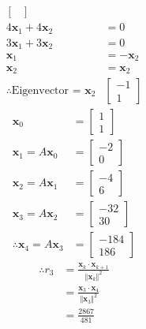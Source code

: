 \documentclass[12pt, a4paper]{scrartcl}
\begin{document}
\begin{enumerate}
\begin{enumerate}
\begin{align*}
\begin{bmatrix}
                    \end{bmatrix}
                    \\ 4\textbf{x}_1+4\textbf{x}_2&=0
                    \\ 3\textbf{x}_1+3\textbf{x}_2&=0
                    \\ \textbf{x}_1 &= -\textbf{x}_2
                    \\ \textbf{x}_2 &= \textbf{x}_2
                    \\ \therefore \mbox{Eigenvector = }\textbf{x}_2&\begin{bmatrix}
                        -1\\1
                    \end{bmatrix}
                \end{align*}
                \begin{align*}
                    \textbf{x}_0 &= \begin{bmatrix}
                        1\\1
                    \end{bmatrix}
                    \\ \textbf{x}_1 = A\textbf{x}_0 &= \begin{bmatrix}
                        -2\\0
                    \end{bmatrix}
                    \\ \textbf{x}_2 = A\textbf{x}_1 &= \begin{bmatrix}
                        -4\\6
                    \end{bmatrix}
                    \\ \textbf{x}_3 = A\textbf{x}_2 &= \begin{bmatrix}
                        -32\\30
                    \end{bmatrix}
                    \\ \therefore \textbf{x}_4 = A\textbf{x}_3 &= \begin{bmatrix}
                        -184\\186
                    \end{bmatrix}
                \end{align*}
                \begin{align*}
                    \therefore r_3&=\frac{\textbf{x}_k\cdot\textbf{x}_{k+1}}{\Vert\textbf{x}_k\Vert^2}
                    \\ &= \frac{\textbf{x}_3\cdot\textbf{x}_4}{\Vert\textbf{x}_3\Vert^2}
                    \\ &= \frac{2867}{481}
                \end{align*}


\end{enumerate}
\end{enumerate}
\end{document}
